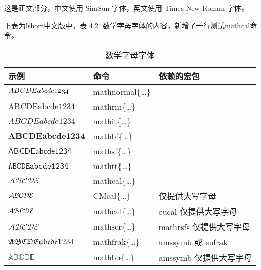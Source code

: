 \documentclass{article}
\begin{document}
这是正文部分，中文使用 SimSun 字体，英文使用 Times New Roman 字体。

下表为lshort中文版中，表 4.2: 数学字母字体的内容，新增了一行测试mathcal命令。

\begin{table}[htp]
  \centering
  \caption{数学字母字体} \label{tbl:math-fonts}
  \begin{tabular}{*{3}{l}}
  \hline
  \textbf{示例}    & \textbf{命令} & \textbf{依赖的宏包}\\
  \hline
  $\mathnormal{ABCDE abcde 1234}$  & {mathnormal}\{\ldots\}&       \\
  $\mathrm{ABCDE abcde 1234}$      & {mathrm}\{\ldots\}    &       \\
  $\mathit{ABCDE abcde 1234}$      & {mathit}\{\ldots\}    &       \\
  $\mathbf{ABCDE abcde 1234}$      & {mathbf}\{\ldots\}    &       \\
  $\mathsf{ABCDE abcde 1234}$      & {mathsf}\{\ldots\}    &       \\
  $\mathtt{ABCDE abcde 1234}$      & {mathtt}\{\ldots\}    &       \\
  $\mathcal{ABCDE}$                  & {mathcal}\{\ldots\}   &     \\ 
  $\CMcal{ABCDE}$                  & {CMcal}\{\ldots\}   & 仅提供大写字母 \\
  \hline
  $\EuScript{ABCDE}$               & {mathcal}\{\ldots\}   & {eucal} 仅提供大写字母 \\
  $\mathscr{ABCDE}$                & {mathscr}\{\ldots\}   & {mathrsfs} 仅提供大写字母\\
  $\mathfrak{ABCDE abcde 1234}$    & {mathfrak}\{\ldots\}  & {amssymb} 或 {eufrak}  \\
  $\mathbb{ABCDE}$                 & {mathbb}\{\ldots\}    & {amssymb} 仅提供大写字母 \\
  \hline
  \end{tabular}
\end{table}
\end{document}
